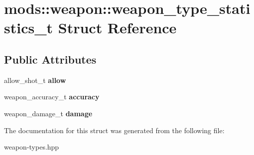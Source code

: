 \hypertarget{structmods_1_1weapon_1_1weapon__type__statistics__t}{}\section{mods\+:\+:weapon\+:\+:weapon\+\_\+type\+\_\+statistics\+\_\+t Struct Reference}
\label{structmods_1_1weapon_1_1weapon__type__statistics__t}
\subsection*{Public Attributes}
\begin{DoxyCompactItemize}
\item 
\mbox{\label{structmods_1_1weapon_1_1weapon__type__statistics__t_ac9ecfd0a47d0f88d02afbcbc1b84bfa6}} 
allow\+\_\+shot\+\_\+t {\bfseries allow}
\item 
\mbox{\label{structmods_1_1weapon_1_1weapon__type__statistics__t_a13cc6eaea09f386f4d841d3d4b54e9c9}} 
weapon\+\_\+accuracy\+\_\+t {\bfseries accuracy}
\item 
\mbox{\label{structmods_1_1weapon_1_1weapon__type__statistics__t_a65da0c0e7b1f851d0b77da667c7b584f}} 
weapon\+\_\+damage\+\_\+t {\bfseries damage}
\end{DoxyCompactItemize}


The documentation for this struct was generated from the following file\+:\begin{DoxyCompactItemize}
\item 
weapon-\/types.\+hpp\end{DoxyCompactItemize}
